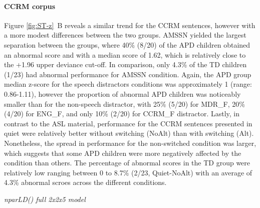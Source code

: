 \documentclass[a4paper, twoside]{templates/ociamthesis}
\begin{document}
\hypertarget{ccrm-corpus}{%
\paragraph*{CCRM corpus}\label{ccrm-corpus}}

Figure \ref{fig:ST-z}~B reveals a similar trend for the CCRM sentences, however with a more modest differences between the two groups. AMSSN yielded the largest separation between the groups, where 40\% (8/20) of the APD children obtained an abnormal score and with a median score of 1.62, which is relatively close to the +1.96 upper deviance cut-off. In comparison, only 4.3\% of the TD children (1/23) had abnormal performance for AMSSN condition. Again, the APD group median z-score for the speech distractors conditions was approximately 1 (range: 0.86-1.11), however the proportion of abnormal APD children was noticeably smaller than for the non-speech distractor, with 25\% (5/20) for MDR\_F, 20\% (4/20) for ENG\_F, and only 10\% (2/20) for CCRM\_F distractor. Lastly, in contrast to the ASL material, performance for the CCRM sentences presented in quiet were relatively better without switching (NoAlt) than with switching (Alt). Nonetheless, the spread in performance for the non-switched condition was larger, which suggests that some APD children were more negatively affected by the condition than others. The percentage of abnormal scores in the TD group were relatively low ranging between 0 to 8.7\% (2/23, Quiet-NoAlt) with an average of 4.3\% abnormal scroes across the different conditions.

\colorbox[HTML]{CCCCFF}{\emph{nparLD() full 2x2x5 model}}
\end{document}
